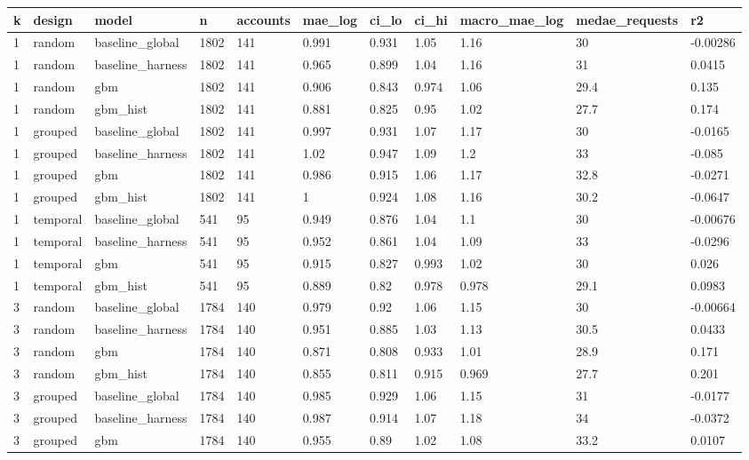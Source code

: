 \begin{tabular}{lllllllllll}
\toprule
k & design & model & n & accounts & mae\_log & ci\_lo & ci\_hi & macro\_mae\_log & medae\_requests & r2 \\
\midrule
1 & random & baseline\_global & 1802 & 141 & 0.991 & 0.931 & 1.05 & 1.16 & 30 & -0.00286 \\
1 & random & baseline\_harness & 1802 & 141 & 0.965 & 0.899 & 1.04 & 1.16 & 31 & 0.0415 \\
1 & random & gbm & 1802 & 141 & 0.906 & 0.843 & 0.974 & 1.06 & 29.4 & 0.135 \\
1 & random & gbm\_hist & 1802 & 141 & 0.881 & 0.825 & 0.95 & 1.02 & 27.7 & 0.174 \\
1 & grouped & baseline\_global & 1802 & 141 & 0.997 & 0.931 & 1.07 & 1.17 & 30 & -0.0165 \\
1 & grouped & baseline\_harness & 1802 & 141 & 1.02 & 0.947 & 1.09 & 1.2 & 33 & -0.085 \\
1 & grouped & gbm & 1802 & 141 & 0.986 & 0.915 & 1.06 & 1.17 & 32.8 & -0.0271 \\
1 & grouped & gbm\_hist & 1802 & 141 & 1 & 0.924 & 1.08 & 1.16 & 30.2 & -0.0647 \\
1 & temporal & baseline\_global & 541 & 95 & 0.949 & 0.876 & 1.04 & 1.1 & 30 & -0.00676 \\
1 & temporal & baseline\_harness & 541 & 95 & 0.952 & 0.861 & 1.04 & 1.09 & 33 & -0.0296 \\
1 & temporal & gbm & 541 & 95 & 0.915 & 0.827 & 0.993 & 1.02 & 30 & 0.026 \\
1 & temporal & gbm\_hist & 541 & 95 & 0.889 & 0.82 & 0.978 & 0.978 & 29.1 & 0.0983 \\
3 & random & baseline\_global & 1784 & 140 & 0.979 & 0.92 & 1.06 & 1.15 & 30 & -0.00664 \\
3 & random & baseline\_harness & 1784 & 140 & 0.951 & 0.885 & 1.03 & 1.13 & 30.5 & 0.0433 \\
3 & random & gbm & 1784 & 140 & 0.871 & 0.808 & 0.933 & 1.01 & 28.9 & 0.171 \\
3 & random & gbm\_hist & 1784 & 140 & 0.855 & 0.811 & 0.915 & 0.969 & 27.7 & 0.201 \\
3 & grouped & baseline\_global & 1784 & 140 & 0.985 & 0.929 & 1.06 & 1.15 & 31 & -0.0177 \\
3 & grouped & baseline\_harness & 1784 & 140 & 0.987 & 0.914 & 1.07 & 1.18 & 34 & -0.0372 \\
3 & grouped & gbm & 1784 & 140 & 0.955 & 0.89 & 1.02 & 1.08 & 33.2 & 0.0107 \\

\end{tabular}
